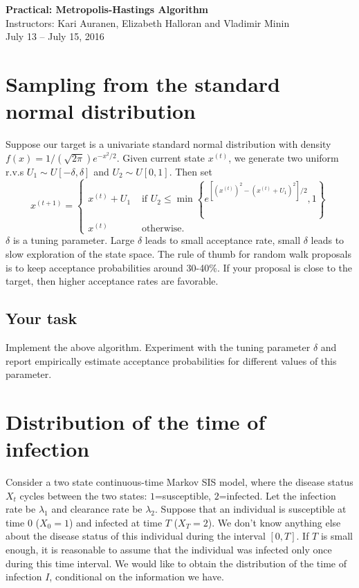 \documentclass[11pt]{article}
\numberwithin{algorithm}{section}
\theoremstyle{remark}
\theoremstyle{definition}
\numberwithin{equation}{section}
\numberwithin{figure}{section}
\begin{document}


\begin{center}
  \textbf{\Large Practical: Metropolis-Hastings Algorithm}\\
  {\large Instructors: Kari Auranen, Elizabeth Halloran and Vladimir Minin}\\
  {\large July 13 -- July 15, 2016}
\end{center}

\section*{Sampling from the standard normal distribution}
Suppose our target is a univariate standard normal distribution with density $f(x) = 1/(\sqrt{2\pi})e^{-x^2/2}$.
Given current state $x^{(t)}$, we generate two uniform r.v.s $U_1 \sim U[-\delta,\delta]$ and 
$U_2 \sim U[0,1]$. Then set
\[
x^{(t+1)} = 
\begin{cases}
  x^{(t)} + U_1 &\text{ if } U_2 \le \min\left\{e^{\left[\left(x^{(t)}\right)^2 - (x^{(t)}+U_1)^2\right]/2},1\right\} \\
  x^{(t)} & \text{ otherwise}.
\end{cases}
\]
$\delta$ is a tuning parameter. Large $\delta$ leads to small acceptance rate, small $\delta$ leads to slow
exploration of the state space. The rule of thumb for random walk proposals is to keep acceptance probabilities
around 30-40\%. If your proposal is close to the target, then higher acceptance rates are favorable.


\subsection*{Your task}
Implement the above algorithm. Experiment with the tuning parameter $\delta$ and report empirically estimate
acceptance probabilities for different values of this parameter.

\section*{Distribution of the time of infection}
Consider a two state continuous-time Markov SIS model, where the disease status $X_t$ cycles between the two states: 
$1$=susceptible, $2$=infected. Let the infection rate be $\lambda_1$ and clearance rate be $\lambda_2$.
Suppose that an individual is susceptible at time $0$ ($X_0 = 1$) and infected at time $T$ ($X_T=2$). We don't know
anything else about the disease status of this individual during the interval $[0,T]$. If $T$ is small enough, 
it is reasonable to assume that the individual was infected only once during this time interval. We would like 
to obtain the distribution of the time of infection $I$, conditional on the information we have.
\end{document}
